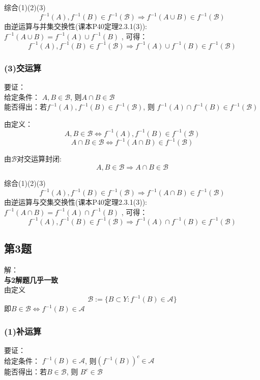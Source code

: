 \documentclass[10pt,a4paper]{article}
\begin{document}
综合(1)(2)(3)
\[ 
f^{-1}(A),f^{-1}(B)\in f^{-1}(\mathscr{B})  \Rightarrow f^{-1}(A \cup B) \in f^{-1}(\mathscr{B})
\]
由逆运算与并集交换性(课本P40定理2.3.1(3)): $  f^{-1}(A \cup B)=f^{-1}(A) \cup f^{-1}(B)  $ , 可得：
\[ 
f^{-1}(A),f^{-1}(B)\in f^{-1}(\mathscr{B})  \Rightarrow f^{-1}(A) \cup f^{-1}(B) \in f^{-1}(\mathscr{B})
\]

\subsubsection{(3)交运算}

\begin{shaded}
	
	要证：\\
	给定条件： $ A,B\in\mathscr{B} $, 则$ A \cap B \in\mathscr{B} $ \\
	能否得出：若$ f^{-1}(A),f^{-1}(B)\in f^{-1}(\mathscr{B}) $,  
	则 $ f^{-1}(A) \cap f^{-1}(B) \in f^{-1}(\mathscr{B}) $
	
\end{shaded}

由定义：
\[ 
A,B\in\mathscr{B} \iff f^{-1}(A),f^{-1}(B)\in f^{-1}(\mathscr{B}) 
\tag{1}
\] 
\[ 
A \cap B \in\mathscr{B} \iff f^{-1}(A \cap B) \in f^{-1}(\mathscr{B})
\tag{2} 
\] 

由$ \mathscr{B} $对交运算封闭:  
\[ 
A,B\in\mathscr{B} \Rightarrow A \cap B \in\mathscr{B}
\tag{3} 
\]

综合(1)(2)(3)
\[ 
f^{-1}(A),f^{-1}(B)\in f^{-1}(\mathscr{B})  \Rightarrow f^{-1}(A \cap B) \in f^{-1}(\mathscr{B})
\]
由逆运算与交集交换性(课本P40定理2.3.1(3)): $  f^{-1}(A \cap B)=f^{-1}(A) \cap f^{-1}(B)  $ , 可得：
\[ 
f^{-1}(A),f^{-1}(B)\in f^{-1}(\mathscr{B})  \Rightarrow f^{-1}(A) \cap f^{-1}(B) \in f^{-1}(\mathscr{B})
\]


\subsection{第3题}
解：\\
\textbf{与2解题几乎一致} \\
由定义 $$ \mathscr{B}:=\{B \subset Y \colon  f^{-1}(B) \in \mathscr{A}	\} $$ 
即$ B\in\mathscr{B}\iff f^{-1}(B) \in \mathscr{A} $


\subsubsection{(1)补运算}

\begin{shaded}
	
	要证：\\
	给定条件： $ f^{-1}(B)\in\mathscr{A} $, 则$ {(f^{-1}(B))}^c\in\mathscr{A} $ \\
	能否得出：若$ B\in \mathscr{B} $,  
	则 $ B^c \in \mathscr{B} $
	
\end{shaded}
\end{document}
